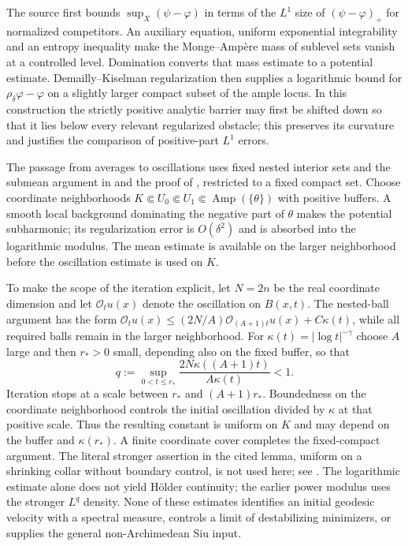 The source first bounds $\sup_X(\psi-\varphi)$ in terms of the
$L^1$ size of $(\psi-\varphi)_+$ for normalized competitors.
An auxiliary equation, uniform exponential integrability and
an entropy inequality make the Monge--Amp\`ere mass of sublevel
sets vanish at a controlled level. Domination converts that mass
estimate to a potential estimate. Demailly--Kiselman regularization
then supplies a logarithmic bound for $\rho_\delta\varphi-\varphi$
on a slightly larger compact subset of the ample locus.
In this construction the strictly positive analytic barrier may
first be shifted down so that it lies below every relevant
regularized obstacle; this preserves its curvature and justifies
the comparison of positive-part $L^1$ errors.

The passage from averages to oscillations uses fixed nested interior
sets and the submean argument in
\cite[Lemma~4.4]{LPT21StabilityPublished} and
the proof of \cite[Lemma~3.3]{Zeriahi20ModulusV1}, restricted to a
fixed compact set. Choose coordinate neighborhoods
$K\Subset U_0\Subset U_1\Subset\operatorname{Amp}(\{\theta\})$
with positive buffers. A smooth local background dominating the
negative part of $\theta$ makes the potential subharmonic;
its regularization error is $O(\delta^2)$ and is absorbed into
the logarithmic modulus. The mean estimate is available on the
larger neighborhood before the oscillation estimate is used on $K$.

To make the scope of the iteration explicit, let $N=2n$ be the
real coordinate dimension and let $\mathcal O_tu(x)$ denote
the oscillation on $B(x,t)$. The nested-ball argument has the form
$\mathcal O_tu(x)\leq(2N/A)\mathcal O_{(A+1)t}u(x)+C\kappa(t)$,
while all required balls remain in the larger neighborhood.
For $\kappa(t)=|\log t|^{-\gamma}$ choose $A$ large and then
$r_*>0$ small, depending also on the fixed buffer, so that
\[
\tag{68.23di}\label{eq:ytd-average-oscillation-buffer}
 q:=\sup_{0<t\leq r_*}
       \frac{2N\kappa((A+1)t)}{A\kappa(t)}<1.
\]
Iteration stops at a scale between $r_*$ and $(A+1)r_*$.
Boundedness on the coordinate neighborhood controls the initial
oscillation divided by $\kappa$ at that positive scale.
Thus the resulting constant is uniform on $K$ and may depend on
the buffer and $\kappa(r_*)$. A finite coordinate cover completes
the fixed-compact argument. The literal stronger assertion in
the cited lemma, uniform on a shrinking collar without boundary
control, is not used here; see
.
The logarithmic estimate alone does not yield H\"older continuity;
the earlier power modulus uses the stronger $L^q$ density.
None of these estimates identifies an initial geodesic velocity
with a spectral measure, controls a limit of destabilizing
minimizers, or supplies the general non-Archimedean Siu input.

